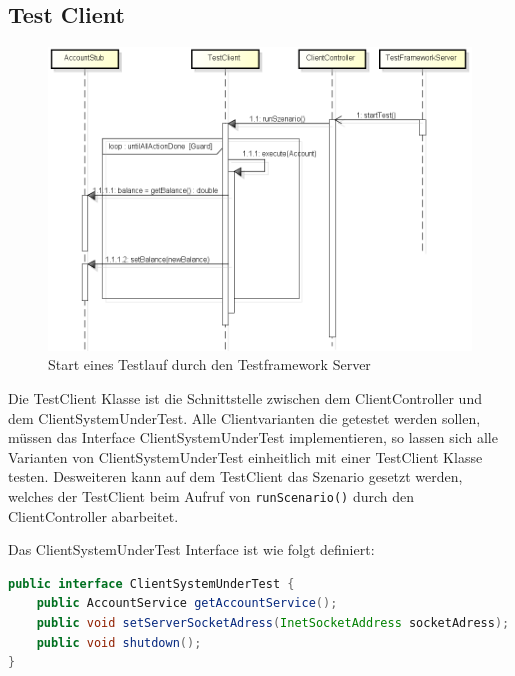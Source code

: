 \subsection{Test Client}
\label{sec:testclient}

\begin{figure}[H]
\begin{center}
\includegraphics[scale=0.4]{image_testFramework/startTest.png}
\end{center}
\caption{Start eines Testlauf durch den Testframework Server}
\end{figure}

Die TestClient Klasse ist die Schnittstelle zwischen dem ClientController und dem ClientSystemUnderTest. Alle Clientvarianten die getestet werden sollen, müssen das Interface ClientSystemUnderTest implementieren, so lassen sich alle Varianten von ClientSystemUnderTest einheitlich mit einer TestClient Klasse testen. Desweiteren kann auf dem TestClient das Szenario gesetzt werden, welches der TestClient beim Aufruf von \verb+runScenario()+ durch den ClientController abarbeitet.

Das ClientSystemUnderTest Interface ist wie folgt definiert:
\begin{lstlisting}[language=java, breaklines=true] 	
public interface ClientSystemUnderTest {	
	public AccountService getAccountService();
	public void setServerSocketAdress(InetSocketAddress socketAdress);
	public void shutdown();
}	
\end{lstlisting}
